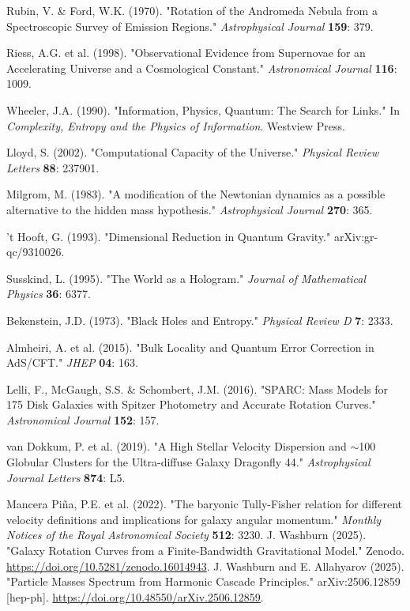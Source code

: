\documentclass[twocolumn,prd,amsmath,amssymb,aps,superscriptaddress,nofootinbib]{revtex4-2}
\begin{document}
\begin{thebibliography}{99}
 Rubin, V. \& Ford, W.K. (1970). "Rotation of the Andromeda Nebula from a Spectroscopic Survey of Emission Regions." \textit{Astrophysical Journal} \textbf{159}: 379.

 Riess, A.G. et al. (1998). "Observational Evidence from Supernovae for an Accelerating Universe and a Cosmological Constant." \textit{Astronomical Journal} \textbf{116}: 1009.

 Wheeler, J.A. (1990). "Information, Physics, Quantum: The Search for Links." In \textit{Complexity, Entropy and the Physics of Information}. Westview Press.

 Lloyd, S. (2002). "Computational Capacity of the Universe." \textit{Physical Review Letters} \textbf{88}: 237901.

 Milgrom, M. (1983). "A modification of the Newtonian dynamics as a possible alternative to the hidden mass hypothesis." \textit{Astrophysical Journal} \textbf{270}: 365.

 't Hooft, G. (1993). "Dimensional Reduction in Quantum Gravity." arXiv:gr-qc/9310026.

 Susskind, L. (1995). "The World as a Hologram." \textit{Journal of Mathematical Physics} \textbf{36}: 6377.

 Bekenstein, J.D. (1973). "Black Holes and Entropy." \textit{Physical Review D} \textbf{7}: 2333.

 Almheiri, A. et al. (2015). "Bulk Locality and Quantum Error Correction in AdS/CFT." \textit{JHEP} \textbf{04}: 163.

 Lelli, F., McGaugh, S.S. \& Schombert, J.M. (2016). "SPARC: Mass Models for 175 Disk Galaxies with Spitzer Photometry and Accurate Rotation Curves." \textit{Astronomical Journal} \textbf{152}: 157.

 van Dokkum, P. et al. (2019). "A High Stellar Velocity Dispersion and $\sim$100 Globular Clusters for the Ultra-diffuse Galaxy Dragonfly 44." \textit{Astrophysical Journal Letters} \textbf{874}: L5.

 Mancera Piña, P.E. et al. (2022). "The baryonic Tully-Fisher relation for different velocity definitions and implications for galaxy angular momentum." \textit{Monthly Notices of the Royal Astronomical Society} \textbf{512}: 3230.
 J. Washburn (2025). "Galaxy Rotation Curves from a Finite-Bandwidth Gravitational Model." Zenodo. \url{https://doi.org/10.5281/zenodo.16014943}.
 J. Washburn and E. Allahyarov (2025). "Particle Masses Spectrum from Harmonic Cascade Principles." arXiv:2506.12859 [hep-ph]. \url{https://doi.org/10.48550/arXiv.2506.12859}.
\end{thebibliography}
\end{document}
